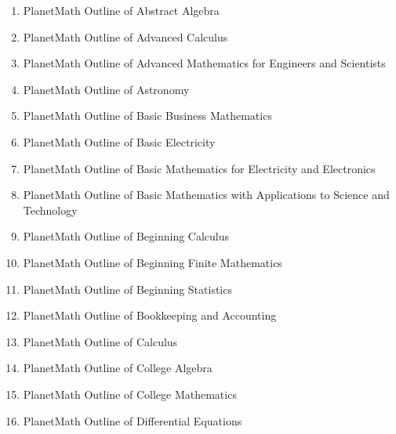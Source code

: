 \documentclass[12pt]{article}
\begin{document}
\begin{enumerate}
\item PlanetMath Outline of Abstract Algebra
\item PlanetMath Outline of Advanced Calculus
\item PlanetMath Outline of Advanced Mathematics for Engineers and Scientists
\item PlanetMath Outline of Astronomy
\item PlanetMath Outline of Basic Business Mathematics
\item PlanetMath Outline of Basic Electricity
\item PlanetMath Outline of Basic Mathematics for Electricity and Electronics
\item PlanetMath Outline of Basic Mathematics with Applications to Science and Technology
\item PlanetMath Outline of Beginning Calculus
\item PlanetMath Outline of Beginning Finite Mathematics
\item PlanetMath Outline of Beginning Statistics
\item PlanetMath Outline of Bookkeeping and Accounting
\item PlanetMath Outline of Calculus
\item PlanetMath Outline of College Algebra
\item PlanetMath Outline of College Mathematics
\item PlanetMath Outline of Differential Equations

\end{enumerate}
\end{document}
